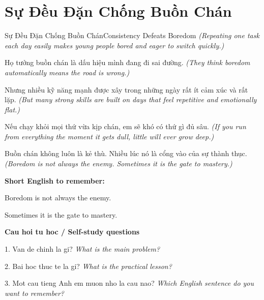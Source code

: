 \section{Sự Đều Đặn Chống Buồn Chán}
\begin{truyen}{Sự Đều Đặn Chống Buồn Chán}{Consistency Defeats Boredom}
\textit{(Repeating one task each day easily makes young people bored and eager to switch quickly.)}

Họ tưởng buồn chán là dấu hiệu mình đang đi sai đường.
\textit{(They think boredom automatically means the road is wrong.)}

Nhưng nhiều kỹ năng mạnh được xây trong những ngày rất ít cảm xúc và rất lặp.
\textit{(But many strong skills are built on days that feel repetitive and emotionally flat.)}

Nếu chạy khỏi mọi thứ vừa kịp chán, em sẽ khó có thứ gì đủ sâu.
\textit{(If you run from everything the moment it gets dull, little will ever grow deep.)}

\end{truyen}

\begin{baihoc}
Buồn chán không luôn là kẻ thù. Nhiều lúc nó là cổng vào của sự thành thục.
\textit{(Boredom is not always the enemy. Sometimes it is the gate to mastery.)}
\end{baihoc}

\begin{ghinhoanh}
\textbf{Short English to remember:}

Boredom is not always the enemy.

Sometimes it is the gate to mastery.

\end{ghinhoanh}

\begin{tuhocnhanh}
\textbf{Cau hoi tu hoc / Self-study questions}

1. Van de chinh la gi? \textit{What is the main problem?}

2. Bai hoc thuc te la gi? \textit{What is the practical lesson?}

3. Mot cau tieng Anh em muon nho la cau nao? \textit{Which English sentence do you want to remember?}
\end{tuhocnhanh}
\ngancach

